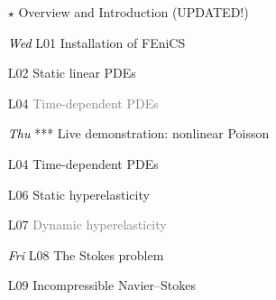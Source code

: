 \documentclass{fenicscourse}
\begin{document}
\begin{frame}
  \begin{enumerate}
  \item[$\star$]
    Overview and Introduction (UPDATED!)
  \item[\textcolor{black}{\it Wed} L01]
    Installation of FEniCS
  \item[L02]
    Static linear PDEs
  \item[L04]
    \textcolor{grey}{Time-dependent PDEs}
    \bigskip
  \item[\textcolor{black}{\it Thu} ***]
    Live demonstration: nonlinear Poisson
  \item[L04]
    Time-dependent PDEs
  \item[L06]
    Static hyperelasticity
  \item[L07]
    \textcolor{grey}{Dynamic hyperelasticity}
    \bigskip
  \item[\textcolor{black}{\it Fri} L08]
    The Stokes problem
  \item[L09]
    Incompressible Navier--Stokes
  \end{enumerate}

  \normalsize

\end{frame}
\end{document}
